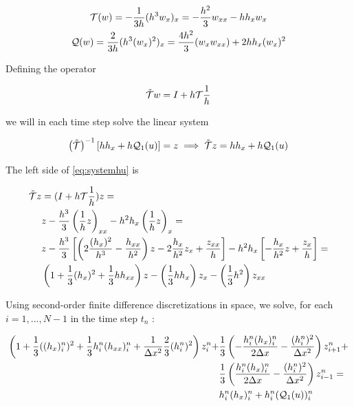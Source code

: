 \begin{gather*}
	\mathcal{T}(w) = -\frac{1}{3h}(h^3w_x)_x = -\frac{h^2}{3}w_{xx} - hh_xw_x \\
	\mathcal{Q}(w) = \frac{2}{3h}(h^3(w_x)^2  )_x = \frac{4h^2}{3}(w_xw_{xx}) + 2hh_x(w_x)^2
\end{gather*}

\indent Defining the operator

\begin{equation}
    \tilde{\mathcal{T}} w = I + h\mathcal{T}\frac{1}{h}
\end{equation}

\noindent we will in each time step  solve the linear system

\begin{equation}
	\label{eq:systemhu}
	\left( \tilde{\mathcal{T}} \right)^{-1}\left[ hh_x + h\mathcal{Q}_1(u) \right]  = z \implies \tilde{\mathcal{T}}z = hh_x + h\mathcal{Q}_1(u)
\end{equation}

\indent The left side of \eqref{eq:systemhu} is

\begin{equation}
\label{eq:ttildez}
\begin{split}
	\tilde{\mathcal{T}}z &=  (I + h\mathcal{T}\frac{1}{h})z = \\
	                     & z - \frac{h^3}{3}\left( \frac{1}{h} z\right)_{xx} - h^2h_x\left( \frac{1}{h} z\right)_x  = \\
						   & z - \frac{h^3}{3}\left[ \left( 2\frac{(h_x)^2}{h^3} - \frac{h_{xx}}{h^2} \right)z - 2\frac{h_x}{h^2}z_x + \frac{z_{xx}}{h}	\right] - h^2h_x\left[ -\frac{h_x}{h^2}z + \frac{z_x}{h}\right] = \\
						   & \left( 1 + \frac{1}{3}(h_x)^2 + \frac{1}{3}hh_{xx}\right)z - \left(\frac{1}{3}hh_x\right)z_x - \left(\frac{1}{3}h^2\right)z_{xx}
\end{split}
\end{equation}

\indent Using second-order finite difference discretizations in space, we solve, for each $i = 1,...,N-1$ in the time step $t_n$ :

\begin{equation}
	\begin{split}
	\left( 1 + \frac{1}{3}((h_x)_i^n)^2 + \frac{1}{3}h_i^n (h_{xx})_i^n + \frac{1}{\Delta x^2}\frac{2}{3}(h_i^n)^2\right)z_i^n + & \frac{1}{3}\left( -\frac{h_i^n(h_x)_i^n}{2\Delta x} - \frac{(h_i^n)^2}{\Delta x^2} \right)z_{i+1}^n + \\ & \frac{1}{3}\left( \frac{h_i^n(h_x)_i^n}{2\Delta x} - \frac{(h_i^n)^2}{\Delta x^2} \right)z_{i-1}^n = \\ & h_i^n(h_x)_{i}^n  + h_i^n(\mathcal{Q}_1(u))_i^n
	\end{split}
\end{equation}


